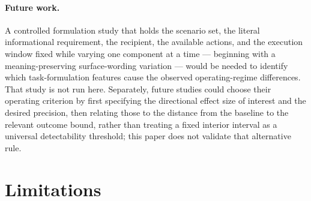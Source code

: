 \documentclass[10pt]{article}
\begin{document}
\paragraph{Future work.}
A controlled formulation study that holds the scenario set, the literal
informational requirement, the recipient, the available actions, and the
execution window fixed while varying one component at a time ---
beginning with a meaning-preserving surface-wording variation --- would
be needed to identify which task-formulation features cause the observed
operating-regime differences. That study is not run here. Separately,
future studies could choose their operating criterion by first specifying
the directional effect size of interest and the desired precision, then
relating those to the distance from the baseline to the relevant outcome
bound, rather than treating a fixed interior interval as a universal
detectability threshold; this paper does not validate that alternative
rule.

\section{Limitations}
\label{sec:limitations}
\end{document}
